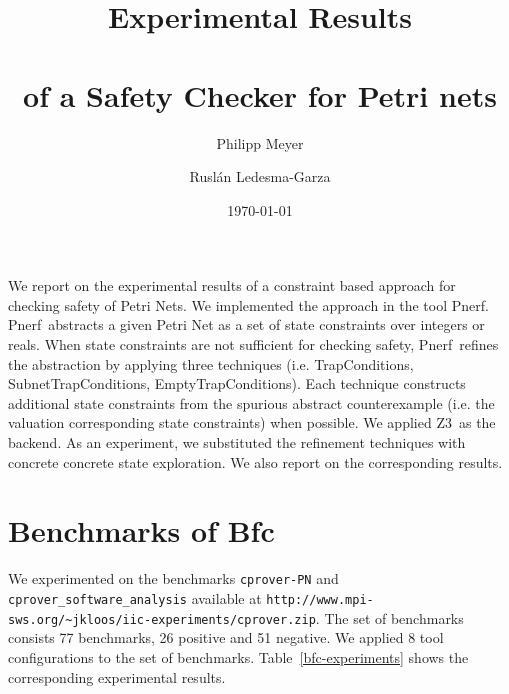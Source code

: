 \documentclass{article}
\newcommand{\bfc}{{\sc Bfc}}
\newcommand{\pnerf}{{\sc Pnerf}}
\newcommand{\zthree}{{\sc Z3}}
\newcommand{\ttt}[1]{\texttt{#1}}
\begin{document}
\title{Experimental Results \\ \mbox{ } \\ of a Safety Checker for Petri nets}
\author{Philipp Meyer \and Rusl\'{a}n Ledesma-Garza}
\date{\today}

\maketitle

We report on the experimental results of a constraint based
approach for checking safety of Petri Nets.
We implemented the approach in the tool \pnerf. \pnerf\ abstracts a
given Petri Net as a set of state constraints over integers or
reals. When state constraints are not sufficient for checking safety,
\pnerf\ refines the abstraction by applying three techniques (i.e. TrapConditions,
SubnetTrapConditions, EmptyTrapConditions). Each technique constructs additional
state constraints from the spurious abstract
counterexample (i.e. the valuation corresponding state constraints) when possible.
We applied \zthree\ as the backend.
As an experiment, we substituted the refinement techniques with
concrete concrete state exploration. We also report on the
corresponding results.


\section{Benchmarks of \bfc}

We experimented on the benchmarks \ttt{cprover-PN} and
\ttt{cprover\_software\_analysis}
available at
\ttt{http://www.mpi-sws.org/\~{}jkloos/iic-experiments/cprover.zip}.
The set of benchmarks consists 77 benchmarks, 26 positive and 51 negative.
We applied 8 tool configurations to the set of benchmarks.
Table~\ref{bfc-experiments} shows the corresponding experimental results.
\end{document}
